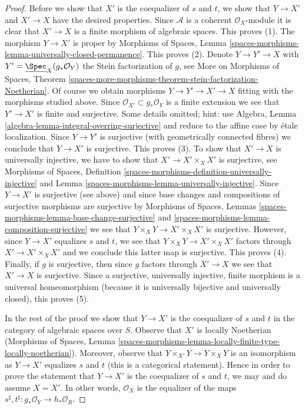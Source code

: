 \begin{proof}
\medskip\noindent
Before we show that $X'$ is the coequalizer of $s$ and $t$, we show
that $Y \to X'$ and $X' \to X$ have the desired properties. Since $\mathcal{A}$
is a coherent $\mathcal{O}_X$-module it is clear that $X' \to X$ is a
finite morphism of algebraic spaces. This proves (1).
The morphism $Y \to X'$ is proper by Morphisms of Spaces, Lemma
\ref{spaces-morphisms-lemma-universally-closed-permanence}. This proves (2).
Denote $Y \to Y' \to X$ with
$Y' = \underline{\Spec}_X(g_*\mathcal{O}_Y)$ the Stein factorization of $g$,
see More on Morphisms of Spaces, Theorem
\ref{spaces-more-morphisms-theorem-stein-factorization-Noetherian}.
Of course we obtain morphisms $Y \to Y' \to X' \to X$ fitting
with the morphisms studied above.
Since $\mathcal{O}_{X'} \subset g_*\mathcal{O}_Y$ is a finite extension
we see that $Y' \to X'$ is finite and surjective.
Some details omitted; hint: use
Algebra, Lemma \ref{algebra-lemma-integral-overring-surjective}
and reduce to the affine case by \'etale localization.
Since $Y \to Y'$ is surjective (with geometrically connected fibres)
we conclude that $Y \to X'$ is surjective. This proves (3).
To show that $X' \to X$ is universally injective, we have to show
that $X' \to X' \times_X X'$ is surjective, see
Morphisms of Spaces, Definition
\ref{spaces-morphisms-definition-universally-injective} and
Lemma \ref{spaces-morphisms-lemma-universally-injective}.
Since $Y \to X'$ is surjective (see above) and since base changes
and compositions of surjective morphisms are surjective by
Morphisms of Spaces, Lemmas
\ref{spaces-morphisms-lemma-base-change-surjective} and
\ref{spaces-morphisms-lemma-composition-surjective}
we see that $Y \times_X Y \to X' \times_X X'$ is surjective.
However, since $Y \to X'$ equalizes $s$ and $t$, we see that
$Y \times_X Y \to X' \times_X X'$ factors through $X' \to X' \times_X X'$
and we conclude this latter map is surjective. This proves (4).
Finally, if $g$ is surjective, then since $g$ factors through $X' \to X$
we see that $X' \to X$ is surjective. Since a surjective, universally
injective, finite morphism is a universal homeomorphism (because it
is universally bijective and universally closed), this proves (5).

\medskip\noindent
In the rest of the proof we show that $Y \to X'$ is the coequalizer
of $s$ and $t$ in the category of algebraic spaces over $S$.
Observe that $X'$ is locally Noetherian
(Morphisms of Spaces, Lemma
\ref{spaces-morphisms-lemma-locally-finite-type-locally-noetherian}).
Moreover, observe that $Y \times_{X'} Y \to Y \times_X Y$ is an
isomorphism as $Y \to X'$ equalizes $s$ and $t$ (this is a categorical
statement). Hence in order to prove the statement that $Y \to X'$
is the coequalizer of $s$ and $t$, we may and do assume $X = X'$.
In other words, $\mathcal{O}_X$ is the equalizer of the maps
$s^\sharp, t^\sharp : g_*\mathcal{O}_Y \to h_*\mathcal{O}_R$.


\end{proof}
